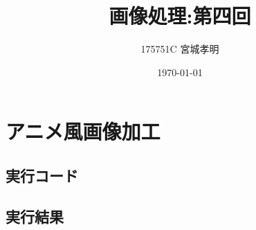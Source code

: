 \documentclass[a4paper,11pt,titlepage]{bxjsarticle}
\title{画像処理:第四回}
\author{175751C 宮城孝明}
\date{\today}
\begin{document}
\maketitle
\tableofcontents
\clearpage
\section{アニメ風画像加工}
\subsection{実行コード}

  
\subsection{実行結果}
\end{document}
